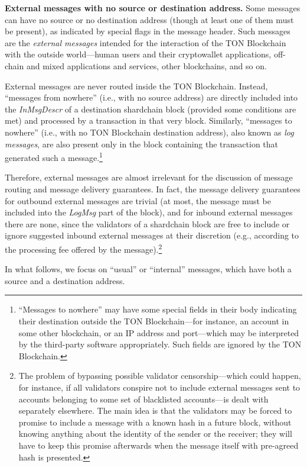 \documentclass[12pt,oneside]{article}
\def\makepoint#1{\medbreak\noindent{\bf #1.\ }}
\def\nxsubpoint{\refstepcounter{subsubsection}%
  \smallbreak\makepoint{\thesubsubsection}}
\def\emb#1{\textbf{#1.}}
\begin{document}
\nxsubpoint\emb{External messages with no source or destination address}
Some messages can have no source or no destination address (though at least one of them must be present), as indicated by special flags in the message header. Such messages are the {\em external messages} intended for the interaction of the TON Blockchain with the outside world---human users and their cryptowallet applications, off-chain and mixed applications and services, other blockchains, and so on.

External messages are never routed inside the TON Blockchain. Instead, ``messages from nowhere'' (i.e., with no source address) are directly included into the \textit{InMsgDescr\/} of a destination shardchain block (provided some conditions are met) and processed by a transaction in that very block. Similarly, ``messages to nowhere'' (i.e., with no TON Blockchain destination address), also known as {\em log messages}, are also present only in the block containing the transaction that generated such a message.\footnote{``Messages to nowhere'' may have some special fields in their body indicating their destination outside the TON Blockchain---for instance, an account in some other blockchain, or an IP address and port---which may be interpreted by the third-party software appropriately. Such fields are ignored by the TON Blockchain.}

Therefore, external messages are almost irrelevant for the discussion of message routing and message delivery guarantees. In fact, the message delivery guarantees for outbound external messages are trivial (at most, the message must be included into the \textit{LogMsg} part of the block), and for inbound external messages there are none, since the validators of a shardchain block are free to include or ignore suggested inbound external messages at their discretion (e.g., according to the processing fee offered by the message).\footnote{The problem of bypassing possible validator censorship---which could happen, for instance, if all validators conspire not to include external messages sent to accounts belonging to some set of blacklisted accounts---is dealt with separately elsewhere. The main idea is that the validators may be forced to promise to include a message with a known hash in a future block, without knowing anything about the identity of the sender or the receiver; they will have to keep this promise afterwards when the message itself with pre-agreed hash is presented.}

In what follows, we focus on ``usual'' or ``internal'' messages, which have both a source and a destination address.
\end{document}
